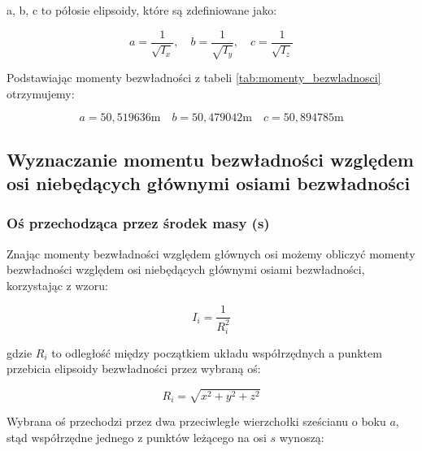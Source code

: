 \documentclass[a4paper,12pt]{article}
\begin{document}
a, b, c to półosie elipsoidy, które są zdefiniowane jako:

\begin{equation*}
    a = \frac{1}{\sqrt{I_x}}, \quad
    b = \frac{1}{\sqrt{I_y}}, \quad
    c = \frac{1}{\sqrt{I_z}}
\end{equation*}

Podstawiając momenty bezwładności z tabeli \ref{tab:momenty_bezwladnosci} otrzymujemy:

\begin{equation*}
    a=50,519636 \text{m} \quad
    b=50,479042 \text{m} \quad
    c=50,894785 \text{m}
\end{equation*}

\subsection{Wyznaczanie momentu bezwładności względem osi niebędących głównymi osiami bezwładności}


\subsubsection{Oś przechodząca przez środek masy (s)}

Znając momenty bezwładności względem głównych osi możemy obliczyć momenty bezwładności względem osi niebędących głównymi osiami bezwładności, korzystając z wzoru:

\begin{equation} \label{eq:moment_bezwladnosci_elipsoida}
    I_i = \frac{1}{R_i^2}
\end{equation}

gdzie $R_i$ to odległość między początkiem układu współrzędnych a punktem przebicia elipsoidy bezwładności przez wybraną oś:

\begin{equation} \label{eq:odleglosc_od_srodka_masy_do_punktu_przebicia_osi}
    R_i = \sqrt{x^2 + y^2 + z^2}
\end{equation}

Wybrana oś przechodzi przez dwa przeciwległe wierzchołki sześcianu o boku $a$, stąd współrzędne jednego z punktów leżącego na osi $s$ wynoszą:
\end{document}

